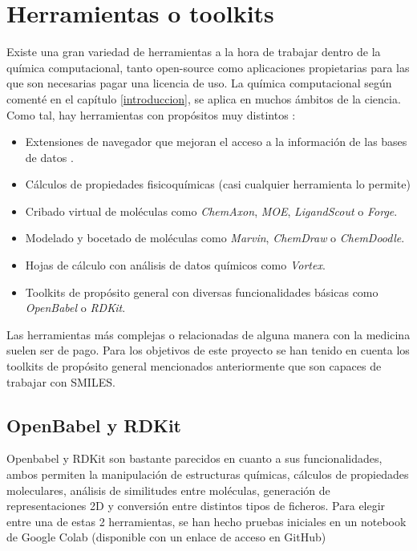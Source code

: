 \section{Herramientas o toolkits} \label{toolkits}

Existe una gran variedad de herramientas a la hora de trabajar dentro de la química computacional, tanto open-source como aplicaciones propietarias para las que son necesarias pagar una licencia de uso. La química computacional según comenté en el capítulo \ref{introduccion}, se aplica en muchos ámbitos de la ciencia. Como tal, hay herramientas con propósitos muy distintos \cite{toolkits_recap}: 
\begin{itemize}
    \item Extensiones de navegador que mejoran el acceso a la información de las bases de datos \cite{safari_extensions}.
    \item Cálculos de propiedades fisicoquímicas (casi cualquier herramienta lo permite)
    \item Cribado virtual de moléculas como \textit{ChemAxon}, \textit{MOE}, \textit{LigandScout} o \textit{Forge}.
    \item Modelado y bocetado de moléculas como \textit{Marvin}, \textit{ChemDraw} o \textit{ChemDoodle}.
    \item Hojas de cálculo con análisis de datos químicos como \textit{Vortex}.
    \item Toolkits de propósito general con diversas funcionalidades básicas como \textit{OpenBabel} o \textit{RDKit}.
\end{itemize}
Las herramientas más complejas o relacionadas de alguna manera con la medicina suelen ser de pago. Para los objetivos de este proyecto se han tenido en cuenta los toolkits de propósito general mencionados anteriormente que son capaces de trabajar con SMILES.

\subsection{OpenBabel y RDKit}

Openbabel y RDKit son bastante parecidos en cuanto a sus funcionalidades, ambos permiten la manipulación de estructuras químicas, cálculos de propiedades moleculares, análisis de similitudes entre moléculas, generación de representaciones 2D y conversión entre distintos tipos de ficheros. Para elegir entre una de estas 2 herramientas, se han hecho pruebas iniciales en un notebook de Google Colab \cite{google_colab} (disponible con un enlace de acceso en GitHub)


